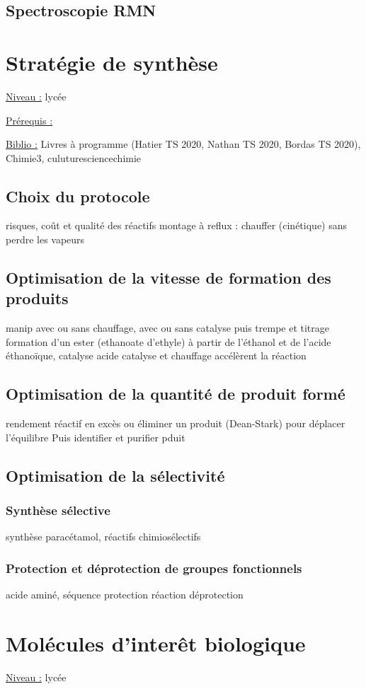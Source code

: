 \documentclass{article}%
\begin{document}
\subsection{Spectroscopie RMN}
\section{Stratégie de synthèse}
\underline{Niveau :} lycée

\underline{Prérequis :}

\underline{Biblio :} Livres à programme (Hatier TS 2020, Nathan TS 2020, Bordas TS 2020), Chimie3, culuturesciencechimie

\subsection{Choix du protocole}
risques, coût et qualité des réactifs
montage à reflux : chauffer (cinétique) sans perdre les vapeurs
\subsection{Optimisation de la vitesse de formation des produits}
manip avec ou sans chauffage, avec ou sans catalyse puis trempe et titrage
formation d'un ester (ethanoate d'ethyle) à partir de l'éthanol et de l'acide éthanoïque, catalyse acide 
catalyse et chauffage accélèrent la réaction
\subsection{Optimisation de la quantité de produit formé}
rendement
réactif en excès ou éliminer un produit (Dean-Stark) pour déplacer l'équilibre
Puis identifier et  purifier pduit
\subsection{Optimisation de la sélectivité}
\subsubsection{Synthèse sélective}
synthèse paracétamol, réactifs chimiosélectifs
\subsubsection{Protection et déprotection de groupes fonctionnels}
acide aminé, séquence protection réaction déprotection
\section{Molécules d'interêt biologique}
\underline{Niveau :} lycée
\end{document}
